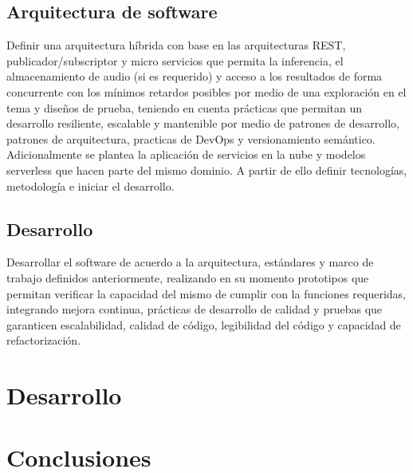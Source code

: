 \section{Arquitectura de software}
Definir una arquitectura híbrida con base en las arquitecturas REST, publicador/subscriptor y micro servicios que permita la inferencia, el almacenamiento de audio (si es requerido) y acceso a los resultados de forma concurrente con los mínimos retardos posibles por medio de una exploración en el tema y diseños de prueba, teniendo en cuenta prácticas que permitan un desarrollo resiliente, escalable y mantenible por medio de patrones de desarrollo, patrones de arquitectura, practicas de DevOps y versionamiento semántico. Adicionalmente se plantea la aplicación de servicios en la nube y modelos serverless que hacen parte del mismo dominio. A partir de ello definir tecnologías, metodología e iniciar el desarrollo.
\section{Desarrollo}
Desarrollar el software de acuerdo a la arquitectura, estándares y marco de trabajo definidos anteriormente, realizando en su momento prototipos que permitan verificar la capacidad del mismo de cumplir con la funciones requeridas, integrando mejora continua, prácticas de desarrollo de calidad y pruebas que garanticen escalabilidad, calidad de código, legibilidad del código y capacidad de refactorización.

\chapter{Desarrollo}

\chapter{Conclusiones}